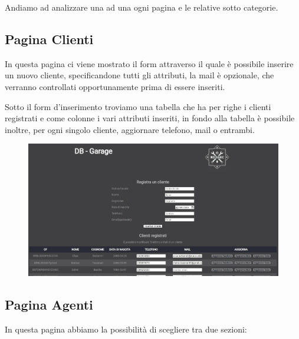 \documentclass[a4paper,12pt]{report}
\begin{document}
Andiamo ad analizzare una ad una ogni pagina e le relative sotto categorie.
\subsection*{Pagina Clienti}
In questa pagina ci viene mostrato il form attraverso il quale è possibile inserire un nuovo cliente, specificandone
%
tutti gli attributi, la mail è opzionale, che verranno controllati opportunamente prima di essere inseriti.

Sotto il form d'inserimento troviamo una tabella che ha per righe i clienti registrati e come colonne i vari attributi	
%
inseriti, in fondo alla tabella è possibile inoltre, per ogni singolo cliente, aggiornare telefono, mail o entrambi.

	\begin{figure}[H]
		\centering
		\includegraphics[scale=0.46]{img/clienti.jpg}
	\end{figure}

\subsection*{Pagina Agenti}
In questa pagina abbiamo la possibilità di scegliere tra due sezioni:
\end{document}
